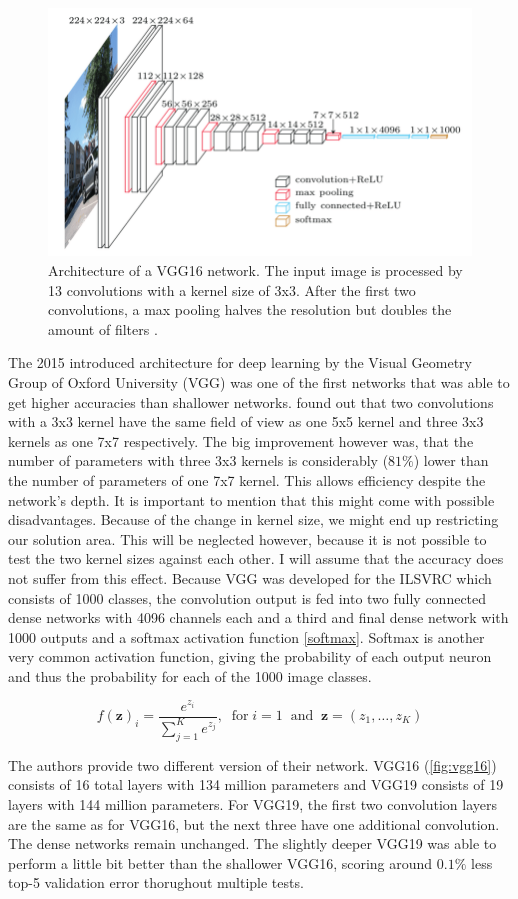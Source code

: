 \begin{figure}[h]
\centering
\includegraphics[width=.8\textwidth]{images/Chapter2/VGGNet-architecture-19.png}
\caption{Architecture of a VGG16 network. The input image is processed by 13 convolutions with a kernel size of 3x3. After the first two convolutions, a max pooling halves the resolution but doubles the amount of filters \citep{Bezdan_2019}.} 
\label{fig:vgg16}
\end{figure}

The 2015 introduced architecture for deep learning by the Visual Geometry Group of Oxford University (VGG) was one of the first networks that was able to get higher accuracies than shallower networks. \citet{Simonyan_2015} found out that two convolutions with a 3x3 kernel have the same field of view as one 5x5 kernel and three 3x3 kernels as one 7x7 respectively. The big improvement however was, that the number of parameters with three 3x3 kernels is considerably ($81\%$) lower than the number of parameters of one 7x7 kernel. This allows efficiency despite the network's depth. It is important to mention that this might come with possible disadvantages. Because of the change in kernel size, we might end up restricting our solution area. This will be neglected however, because it is not possible to test the two kernel sizes against each other. I will assume that the accuracy does not suffer from this effect.  Because VGG was developed for the ILSVRC which consists of 1000 classes, the convolution output is fed into two fully connected dense networks with 4096 channels each and a third and final dense network with 1000 outputs and a softmax activation function \eqref{softmax}. Softmax is another very common activation function, giving the probability of each output neuron and thus the probability for each of the 1000 image classes.

\begin{equation}
    f(\pmb{z})_i = \frac{e^{z_i}}{\sum_{j=1}^{K} e^{z_j}}, \; \;  \text{for} \; i=1 \; \; \text{and} \; \; \pmb{z} = (z_1,\ldots,z_K)
\label{softmax}
\end{equation}

The authors provide two different version of their network. VGG16 (\autoref{fig:vgg16}) consists of 16 total layers with 134 million parameters and VGG19 consists of 19 layers with 144 million parameters. For VGG19, the first two convolution layers are the same as for VGG16, but the next three have one additional convolution. The dense networks remain unchanged. The slightly deeper VGG19 was able to perform a little bit better than the shallower VGG16, scoring around $0.1\%$ less top-5 validation error thorughout multiple tests.